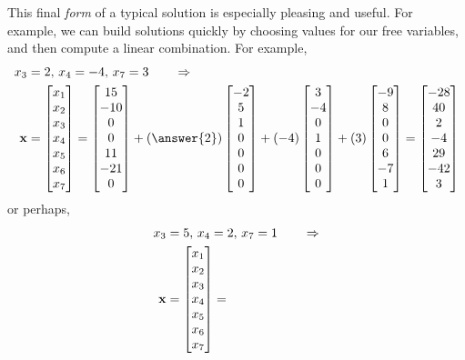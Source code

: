 \documentclass{ximera}
\begin{document}
\begin{example}
  This final \textit{form} of a typical solution is especially
  pleasing and useful.  For example, we can build solutions quickly by
  choosing values for our free variables, and then compute a linear
  combination.  For example,
  \begin{align*}
    x_3&=2,\,
         x_4=-4,\,
         x_7=3
         \quad\quad\Rightarrow\\
    \vect{x}&=
              \colvector{x_1\\x_2\\x_3\\x_4\\x_5\\x_6\\x_7}=
    \colvector{15\\ -10\\ 0\\ 0\\ 11\\ -21\\ 0}+
    (\answer{2})\colvector{-2\\ 5\\ 1\\ 0\\ 0\\ 0\\ 0}+
    (-4)\colvector{3\\ -4\\ 0\\ 1\\ 0\\ 0\\ 0}+
    (3)\colvector{-9\\ 8\\ 0\\ 0\\ 6\\ -7\\ 1}
    =
    \colvector{-28\\40\\2\\-4\\29\\-42\\3}
  \end{align*}
  or perhaps,
  \begin{align*}
    x_3&=5,\,
         x_4=2,\,
         x_7=1
         \quad\quad\Rightarrow\\
    \vect{x}&=
              \colvector{x_1\\x_2\\x_3\\x_4\\x_5\\x_6\\x_7}=

\end{align*}
\end{example}
\end{document}

